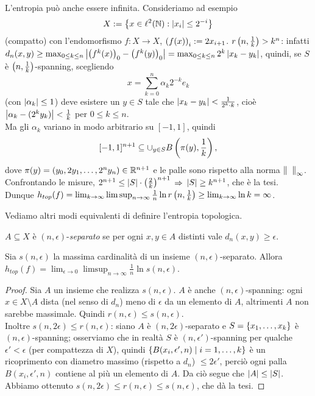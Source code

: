\begin{esempio}L'entropia può anche essere infinita. Consideriamo ad esempio
\[ X:=\left\{x\in\ell^2(\mathbb{N}):\left|x_i\right|\le 2^{-i}\right\} \]
(compatto) con l'endomorfismo $f:X\to X$, $\left(f(x)\right)_i:=2x_{i+1}$. \Eacc $r\left(n,\frac{1}{k}\right)>k^n$:
infatti $d_n(x,y)\ge\max_{0\le k\le n}\left|\left(f^k(x)\right)_0-\left(f^k(y)\right)_0\right|=\max_{0\le k\le n}2^k\left|x_k-y_k\right|$,
quindi, se $S$ è $\left(n,\frac{1}{k}\right)$-spanning, scegliendo
\[ x=\sum_{k=0}^n\alpha_k 2^{-k}e_k \]
(con $\left|\alpha_k\right|\le 1$) deve esistere un $y\in S$ tale che $\left|x_k-y_k\right|<\frac{1}{2^k\cdot k}$,
cioè $\left|\alpha_k-(2^k y_k)\right|<\frac{1}{k}$ per $0\le k\le n$. \\
Ma gli $\alpha_k$ variano in modo arbitrario su $[-1,1]$, quindi
\[ [-1,1]^{n+1}\subseteq \cup_{y\in S}B\left(\pi(y),\frac{1}{k}\right), \]
dove $\pi(y)=(y_0,2y_1,\dots,2^n y_n)\in \mathbb{R}^{n+1}$ e le palle sono rispetto alla norma $\norm{\fantasma{a}}_\infty$.
Confrontando le misure, $2^{n+1}\le \left|S\right|\cdot\left(\frac{2}{k}\right)^{n+1}$ $\Rightarrow$ $\left|S\right|\ge k^{n+1}$, che è la tesi. \\
Dunque $h_{top}(f)=\lim_{k\to\infty}\limsup_{n\to\infty}\frac{1}{n}\ln r\left(n,\frac{1}{k}\right)\ge\lim_{k\to\infty}\ln k=\infty$.
\end{esempio}

Vediamo altri modi equivalenti di definire l'entropia topologica.

\begin{defi}$A\subseteq X$ è $(n,\epsilon)$-\emph{separato} se per ogni $x,y\in A$ distinti
vale $d_n(x,y)\ge\epsilon$.
\end{defi}

\begin{prop}Sia $s(n,\epsilon)$ la massima cardinalità di un insieme $(n,\epsilon)$-separato.
Allora $h_{top}(f)=\lim_{\epsilon\to 0}\limsup_{n\to\infty}\frac{1}{n}\ln s(n,\epsilon)$.
\end{prop}

\begin{proof}Sia $A$ un insieme che realizza $s(n,\epsilon)$. $A$ è anche $(n,\epsilon)$-spanning:
ogni $x\in X\setminus A$ dista (nel senso di $d_n$) meno di $\epsilon$ da un elemento di $A$, altrimenti $A$
non sarebbe massimale. Quindi $r(n,\epsilon)\le s(n,\epsilon)$. \\
Inoltre $s(n,2\epsilon)\le r(n,\epsilon)$: siano $A$ è $(n,2\epsilon)$-separato
e $S=\left\{x_1,\dots,x_k\right\}$ è $(n,\epsilon)$-spanning; osserviamo che in realtà
$S$ è $(n,\epsilon')$-spanning per qualche $\epsilon'<\epsilon$ (per compattezza di $X$),
quindi $\left\{B(x_i,\epsilon',n)\mid i=1,\dots,k\right\}$ è un ricoprimento con diametro massimo (rispetto a $d_n$) $\le 2\epsilon'$,
perciò ogni palla $B(x_i,\epsilon',n)$ contiene al più un elemento di $A$.
Da ciò segue che $\left|A\right|\le\left|S\right|$. \\
Abbiamo ottenuto $s(n,2\epsilon)\le r(n,\epsilon)\le s(n,\epsilon)$, che dà la tesi.
\end{proof}

